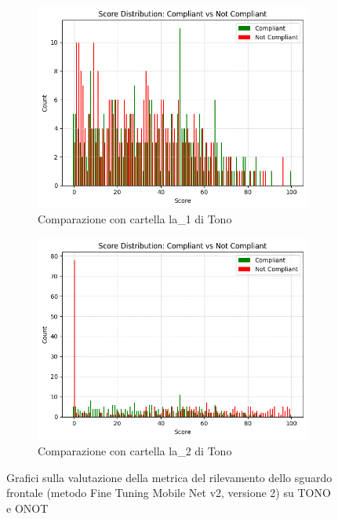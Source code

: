 \documentclass[12pt,a4paper,openright,twoside]{book}
\begin{document}
\begin{figure}[htbp]
    \centering
    \begin{subfigure}{0.49\textwidth}
        \centering
        \includegraphics[width=.7\linewidth]{figures/score-distribution-frontal-gaze-gdd-v2-la1.png}
        \caption{Comparazione con cartella la\_1 di Tono}
        \label{fig:score_distribution_frontal_gaze_gdd_v2_la1}
    \end{subfigure}
    \hfill
    \begin{subfigure}{0.49\textwidth}
        \centering
        \includegraphics[width=.7\linewidth]{figures/score-distribution-frontal-gaze-gdd-v2-la2.png}
        \caption{Comparazione con cartella la\_2 di Tono}
        \label{fig:score_distribution_frontal_gaze_gdd_v2_la2}
    \end{subfigure}

    \caption{Grafici sulla valutazione della metrica del rilevamento dello sguardo frontale (metodo Fine Tuning Mobile Net v2, versione 2) su TONO e ONOT}
\end{figure}
\end{document}
